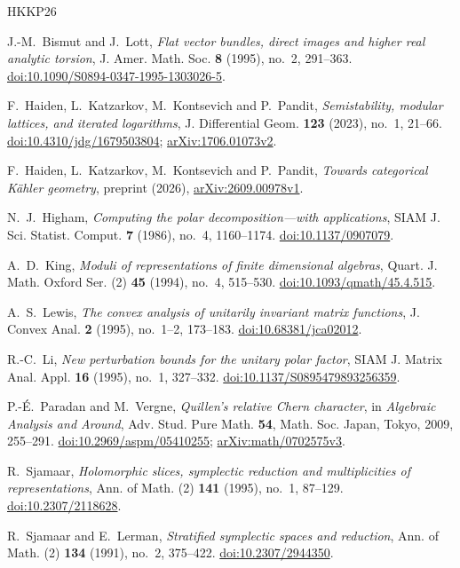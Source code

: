 \begin{thebibliography}{HKKP26}

J.-M.~Bismut and J.~Lott,
\textit{Flat vector bundles, direct images and higher real analytic torsion},
J. Amer. Math. Soc. \textbf{8} (1995), no.~2, 291--363.
\href{https://doi.org/10.1090/S0894-0347-1995-1303026-5}{doi:10.1090/S0894-0347-1995-1303026-5}.

F.~Haiden, L.~Katzarkov, M.~Kontsevich and P.~Pandit,
\textit{Semistability, modular lattices, and iterated logarithms},
J. Differential Geom. \textbf{123} (2023), no.~1, 21--66.
\href{https://doi.org/10.4310/jdg/1679503804}{doi:10.4310/jdg/1679503804};
\href{https://arxiv.org/abs/1706.01073v2}{arXiv:1706.01073v2}.

F.~Haiden, L.~Katzarkov, M.~Kontsevich and P.~Pandit,
\textit{Towards categorical K\"ahler geometry},
preprint (2026), \href{https://arxiv.org/abs/2609.00978v1}{arXiv:2609.00978v1}.

N.~J.~Higham,
\textit{Computing the polar decomposition---with applications},
SIAM J. Sci. Statist. Comput. \textbf{7} (1986), no.~4, 1160--1174.
\href{https://doi.org/10.1137/0907079}{doi:10.1137/0907079}.

A.~D.~King,
\textit{Moduli of representations of finite dimensional algebras},
Quart. J. Math. Oxford Ser. (2) \textbf{45} (1994), no.~4, 515--530.
\href{https://doi.org/10.1093/qmath/45.4.515}{doi:10.1093/qmath/45.4.515}.

A.~S.~Lewis,
\textit{The convex analysis of unitarily invariant matrix functions},
J. Convex Anal. \textbf{2} (1995), no.~1--2, 173--183.
\href{https://doi.org/10.68381/jca02012}{doi:10.68381/jca02012}.

R.-C.~Li,
\textit{New perturbation bounds for the unitary polar factor},
SIAM J. Matrix Anal. Appl. \textbf{16} (1995), no.~1, 327--332.
\href{https://doi.org/10.1137/S0895479893256359}{doi:10.1137/S0895479893256359}.

P.-\'E.~Paradan and M.~Vergne,
\textit{Quillen's relative Chern character},
in \textit{Algebraic Analysis and Around},
Adv. Stud. Pure Math. \textbf{54}, Math. Soc. Japan, Tokyo, 2009,
255--291.
\href{https://doi.org/10.2969/aspm/05410255}{doi:10.2969/aspm/05410255};
\href{https://arxiv.org/abs/math/0702575v3}{arXiv:math/0702575v3}.

R.~Sjamaar,
\textit{Holomorphic slices, symplectic reduction and multiplicities of
representations},
Ann. of Math. (2) \textbf{141} (1995), no.~1, 87--129.
\href{https://doi.org/10.2307/2118628}{doi:10.2307/2118628}.

R.~Sjamaar and E.~Lerman,
\textit{Stratified symplectic spaces and reduction},
Ann. of Math. (2) \textbf{134} (1991), no.~2, 375--422.
\href{https://doi.org/10.2307/2944350}{doi:10.2307/2944350}.

\end{thebibliography}

